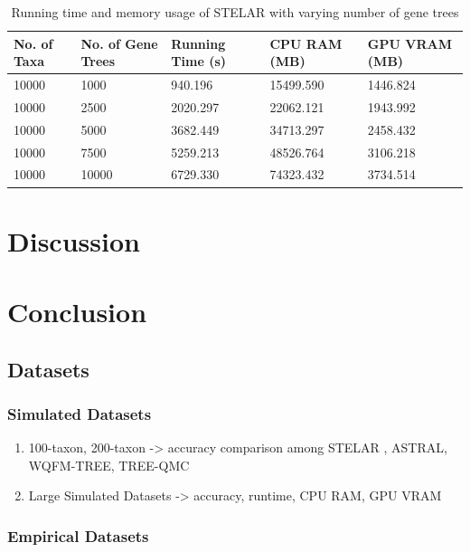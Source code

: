 \documentclass[runningheads]{llncs}
\begin{document}
\begin{table}[h]
\caption{Running time and memory usage of STELAR with varying number of gene trees}
\centering
\begin{tabular}{l l l l l}
\toprule
No. of Taxa & No. of Gene Trees & Running Time (s) & CPU RAM (MB) & GPU VRAM (MB) \\
\midrule
10000  & 1000 & 940.196   & 15499.590 & 1446.824 \\
10000  & 2500 & 2020.297   & 22062.121 & 1943.992 \\
10000  & 5000 & 3682.449   & 34713.297 & 2458.432 \\
10000  & 7500 & 5259.213   & 48526.764 & 3106.218 \\
10000  & 10000 & 6729.330   & 74323.432 & 3734.514 \\
\bottomrule
\end{tabular}
\end{table}



\section{Discussion}


\section{Conclusion}



\subsection{Datasets}

\subsubsection{Simulated Datasets}

\begin{enumerate}
    \item 100-taxon, 200-taxon -> accuracy comparison among STELAR , ASTRAL, WQFM-TREE, TREE-QMC

    \item Large Simulated Datasets -> accuracy, runtime, CPU RAM, GPU VRAM

    

    
\end{enumerate}

\subsubsection{Empirical Datasets}
\end{document}
